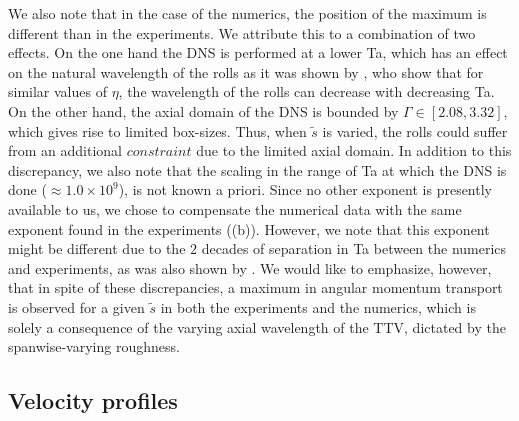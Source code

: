 We also note that in the case of the numerics, the position of the maximum is different than in the experiments. We attribute this to a combination of two effects. On the one hand the DNS is performed at a lower Ta, which has an effect on the natural wavelength of the rolls as it was shown by \citet{Chouippe2014}, who show that for similar values of $\eta$, the wavelength of the rolls can decrease with decreasing Ta. On the other hand, the axial domain of the DNS is bounded by $\Gamma\in[2.08,3.32]$, which gives rise to limited box-sizes. Thus, when $\tilde{s}$ is varied, the rolls could suffer from an additional $\textit{constraint}$ due to the limited axial domain. In addition to this discrepancy, we also note that the scaling in the range of Ta at which the DNS is done ($\approx 1.0\times 10^9$), is not known a priori. Since no other exponent is presently available to us, we chose to compensate the numerical data with the same exponent found in the experiments ((b)). However, we note that this exponent might be different due to the $2$ decades of separation  in Ta between the numerics and experiments, as was also shown by \citet{Zhu2018}. We would like to emphasize, however, that in spite of these discrepancies, a maximum in angular momentum transport is observed for a given $\tilde{s}$ in both the experiments and the numerics, which is solely a consequence of the varying axial wavelength of the TTV, dictated by the spanwise-varying roughness.


\subsection{Velocity profiles}
\label{sec:results_velprofiles}

